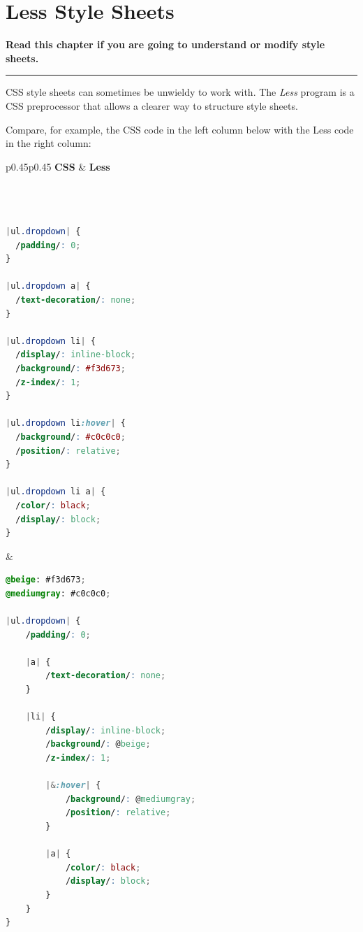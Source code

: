 \documentclass[11pt,oneside,a4paper]{memoir}
\begin{document}
\chapter{Less Style Sheets}\label{chap-less-use}

\textbf{Read this chapter if you are going to understand or modify style sheets.}
\plainbreak{3}

CSS style sheets can sometimes be unwieldy to work with. The \emph{Less} program is a CSS
preprocessor that allows a clearer way to structure style sheets.

Compare, for example, the CSS code in the left column below with the Less code in the right column:

\lstset{frame=} %

\begin{center}
\begin{tabular}{p{}p{}}
\hline
\textbf{CSS} & \textbf{Less}\\
\hline
\begin{lstlisting}[language=CSS,aboveskip=0mm,belowskip=0mm]



|ul.dropdown| {
  /padding/: 0;
}

|ul.dropdown a| {
  /text-decoration/: none;
}

|ul.dropdown li| {
  /display/: inline-block;
  /background/: #f3d673;
  /z-index/: 1;
}

|ul.dropdown li:hover| {
  /background/: #c0c0c0;
  /position/: relative;
}

|ul.dropdown li a| {
  /color/: black;
  /display/: block;
}
\end{lstlisting}

&

\begin{lstlisting}[language=CSS,aboveskip=0mm,belowskip=0mm]
@beige: #f3d673;
@mediumgray: #c0c0c0;

|ul.dropdown| {
    /padding/: 0;

    |a| {
        /text-decoration/: none;
    }

    |li| {
        /display/: inline-block;
        /background/: @beige;
        /z-index/: 1;

        |&:hover| {
            /background/: @mediumgray;
            /position/: relative;
        }

        |a| {
            /color/: black;
            /display/: block;
        }
    }
}
\end{lstlisting}\\
\hline
\end{tabular}
\end{center}
\end{document}
